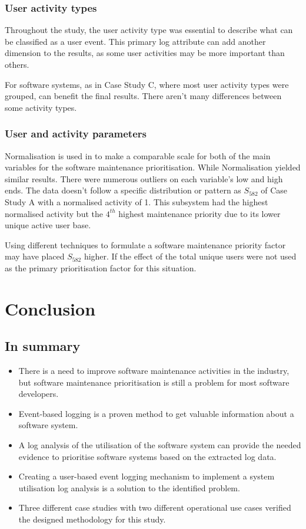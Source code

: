 \subsubsection{User activity types}
Throughout the study, the user activity type was essential to describe what can be classified as a user event. This primary log attribute can add another dimension to the results, as some user activities may be more important than others. \par For software systems, as in Case Study C, where most user activity types were grouped, can benefit the final results. There aren't many differences between some activity types. 

\subsubsection{User and activity parameters}
\par Normalisation is used in  to make a comparable scale for both of the main variables for the software maintenance prioritisation. While Normalisation yielded similar results. There were numerous outliers on each variable's low and high ends. The data doesn't follow a specific distribution or pattern as $S_{582}$ of Case Study A with a normalised activity of 1. This subsystem had the highest normalised activity but the $4^{th}$ highest maintenance priority due to its lower unique active user base.\par Using different techniques to formulate a software maintenance priority factor may have placed $S_{582}$ higher. If the effect of the total unique users were not used as the primary prioritisation factor for this situation. 

\clearpage

\section{Conclusion}

\subsection{In summary}
\begin{itemize}
	\item There is a need to improve software maintenance activities in the industry, but software maintenance prioritisation is still a problem for most software developers.
	\item Event-based logging is a proven method to get valuable information about a software system.
	\item A log analysis of the utilisation of the software system can provide the needed evidence to prioritise software systems based on the extracted log data.
	\item Creating a user-based event logging mechanism to implement a system utilisation log analysis is a solution to the identified problem.
	\item Three different case studies with two different operational use cases verified the designed methodology for this study.
\end{itemize}

